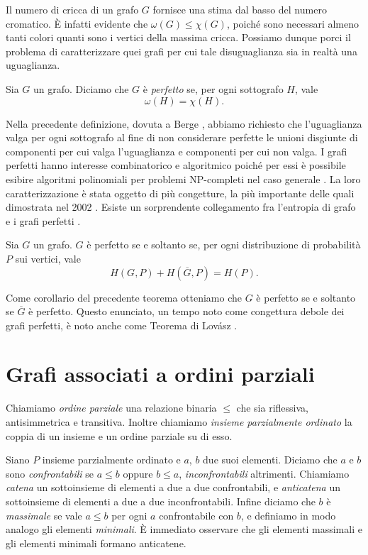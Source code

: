 Il numero di cricca di un grafo \(G\) fornisce una stima dal basso del numero cromatico. È infatti evidente che \(\omega(G)\le\chi(G)\), poiché sono necessari almeno tanti colori quanti sono i vertici della massima cricca. Possiamo dunque porci il problema di caratterizzare quei grafi per cui tale disuguaglianza sia in realtà una uguaglianza. 
\begin{definition}
	Sia \(G\) un grafo. Diciamo che \(G\) è \emph{perfetto} se, per ogni sottografo \(H\), vale
	\[\omega(H)=\chi(H).\]
\end{definition}
Nella precedente definizione, dovuta a Berge \cite{Berge1960}, abbiamo richiesto che l'uguaglianza valga per ogni sottografo al fine di non considerare perfette le unioni disgiunte di componenti per cui valga l'uguaglianza e componenti per cui non valga. I grafi perfetti hanno interesse combinatorico e algoritmico poiché per essi è possibile esibire algoritmi polinomiali per problemi NP-completi nel caso generale \cite{Golumbic2004}. La loro caratterizzazione è stata oggetto di più congetture, la più importante delle quali dimostrata nel 2002 \cite{Chudnovsky2006}. Esiste un sorprendente collegamento fra l'entropia di grafo e i grafi perfetti \cite{Csiszar1990}. 
\begin{theorem}
	 \label{lovasztheorem} Sia \(G\) un grafo. \(G\) è perfetto se e soltanto se, per ogni distribuzione di probabilità \(P\) sui vertici, vale
	\[H\left(G,P\right)+H\left(\overline{G},P\right)=H(P).\]
\end{theorem}
Come corollario del precedente teorema otteniamo che \(G\) è perfetto se e soltanto se \(\overline{G}\) è perfetto. Questo enunciato, un tempo noto come congettura debole dei grafi perfetti, è noto anche come Teorema di Lovász \cite{Lovasz1972}.

\section{Grafi associati a ordini parziali}

\begin{definition}
  Chiamiamo \emph{ordine parziale} una relazione binaria \(\le\) che sia riflessiva, antisimmetrica e transitiva. Inoltre chiamiamo \emph{insieme parzialmente ordinato} la coppia di un insieme e un ordine parziale su di esso.
\end{definition}

Siano \(P\) insieme parzialmente ordinato e \(a\), \(b\) due suoi elementi. Diciamo che \(a\) e \(b\) sono \emph{confrontabili} se \(a\le b\) oppure \(b\le a\), \emph{inconfrontabili} altrimenti. Chiamiamo \emph{catena} un sottoinsieme di elementi a due a due confrontabili, e \emph{anticatena} un sottoinsieme di elementi a due a due inconfrontabili. Infine diciamo che \(b\) è \emph{massimale} se vale \(a\le b\) per ogni \(a\) confrontabile con \(b\), e definiamo in modo analogo gli elementi \emph{minimali}. È immediato osservare che gli elementi massimali e gli elementi minimali formano anticatene.

